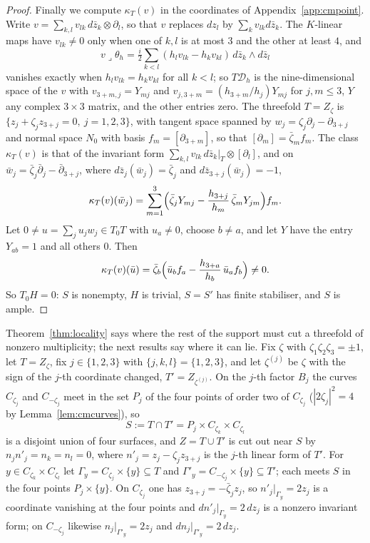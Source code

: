 \documentclass[11pt,reqno]{amsart}
\numberwithin{equation}{section}
\theoremstyle{plain}
\theoremstyle{definition}
\newcommand{\cD}{\mathcal{D}}
\begin{document}
\begin{proof}
Finally we compute $\kappa_{T}(v)$ in the coordinates of Appendix~\ref{app:cmpoint}. Write $v=\sum_{k,l}v_{lk}\,d\bar z_{k}\otimes\partial_{l}$, so that $v$ replaces $dz_{l}$ by $\sum_{k}v_{lk}d\bar z_{k}$. The $K$-linear maps have $v_{lk}\ne0$ only when one of $k,l$ is at most $3$ and the other at least $4$, and
\[
v\lrcorner\theta_{h}=\tfrac{i}{2}\sum_{k<l}(h_{l}v_{lk}-h_{k}v_{kl})\,d\bar z_{k}\wedge d\bar z_{l}
\]
vanishes exactly when $h_{l}v_{lk}=h_{k}v_{kl}$ for all $k<l$; so $T\cD_{h}$ is the nine-dimensional space of the $v$ with $v_{3+m,j}=Y_{mj}$ and $v_{j,3+m}=(h_{3+m}/h_{j})Y_{mj}$ for $j,m\le3$, $Y$ any complex $3\times3$ matrix, and the other entries zero. The threefold $T=Z_{\zeta}$ is $\{z_{j}+\zeta_{j}z_{3+j}=0,\ j=1,2,3\}$, with tangent space spanned by $w_{j}=\zeta_{j}\partial_{j}-\partial_{3+j}$ and normal space $N_{0}$ with basis $f_{m}=[\partial_{3+m}]$, so that $[\partial_{m}]=\bar\zeta_{m}f_{m}$. The class $\kappa_{T}(v)$ is that of the invariant form $\sum_{k,l}v_{lk}\,d\bar z_{k}|_{T}\otimes[\partial_{l}]$, and on $\bar w_{j}=\bar\zeta_{j}\bar\partial_{j}-\bar\partial_{3+j}$, where $d\bar z_{j}(\bar w_{j})=\bar\zeta_{j}$ and $d\bar z_{3+j}(\bar w_{j})=-1$,
\[
\kappa_{T}(v)(\bar w_{j})=\sum_{m=1}^{3}\Bigl(\bar\zeta_{j}Y_{mj}-\frac{h_{3+j}}{h_{m}}\,\bar\zeta_{m}Y_{jm}\Bigr)f_{m}.
\]
Let $0\ne u=\sum_{j}u_{j}w_{j}\in T_{0}T$ with $u_{a}\ne0$, choose $b\ne a$, and let $Y$ have the entry $Y_{ab}=1$ and all others $0$. Then
\[
\kappa_{T}(v)(\bar u)=\bar\zeta_{b}\Bigl(\bar u_{b}f_{a}-\frac{h_{3+a}}{h_{b}}\,\bar u_{a}f_{b}\Bigr)\ne0 .
\]
So $T_{0}H=0$: $S$ is nonempty, $H$ is trivial, $S=S'$ has finite stabiliser, and $S$ is ample.
\end{proof}

Theorem~\ref{thm:locality} says where the rest of the support must cut a threefold of nonzero multiplicity; the next results say where it can lie. Fix $\zeta$ with $\zeta_{1}\zeta_{2}\zeta_{3}=\pm1$, let $T=Z_{\zeta}$, fix $j\in\{1,2,3\}$ with $\{j,k,l\}=\{1,2,3\}$, and let $\zeta^{(j)}$ be $\zeta$ with the sign of the $j$-th coordinate changed, $T'=Z_{\zeta^{(j)}}$. On the $j$-th factor $B_{j}$ the curves $C_{\zeta_{j}}$ and $C_{-\zeta_{j}}$ meet in the set $P_{j}$ of the four points of order two of $C_{\zeta_{j}}$ ($|2\zeta_{j}|^{2}=4$ by Lemma~\ref{lem:cmcurves}), so
\[
S:=T\cap T'=P_{j}\times C_{\zeta_{k}}\times C_{\zeta_{l}}
\]
is a disjoint union of four surfaces, and $Z=T\cup T'$ is cut out near $S$ by $n_{j}n'_{j}=n_{k}=n_{l}=0$, where $n'_{j}=z_{j}-\zeta_{j}z_{3+j}$ is the $j$-th linear form of $T'$. For $y\in C_{\zeta_{k}}\times C_{\zeta_{l}}$ let $\Gamma_{y}=C_{\zeta_{j}}\times\{y\}\subseteq T$ and $\Gamma'_{y}=C_{-\zeta_{j}}\times\{y\}\subseteq T'$; each meets $S$ in the four points $P_{j}\times\{y\}$. On $C_{\zeta_{j}}$ one has $z_{3+j}=-\bar\zeta_{j}z_{j}$, so $n'_{j}|_{\Gamma_{y}}=2z_{j}$ is a coordinate vanishing at the four points and $dn'_{j}|_{\Gamma_{y}}=2\,dz_{j}$ is a nonzero invariant form; on $C_{-\zeta_{j}}$ likewise $n_{j}|_{\Gamma'_{y}}=2z_{j}$ and $dn_{j}|_{\Gamma'_{y}}=2\,dz_{j}$.
\end{document}
